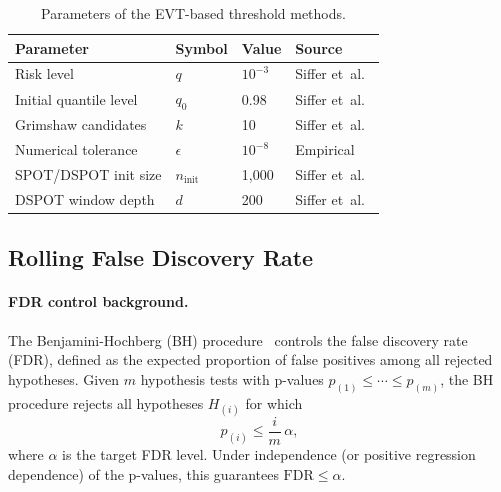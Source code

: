 \documentclass[11pt]{report}
\begin{document}
\begin{table}[H]
\centering
\caption{Parameters of the EVT-based threshold methods.}
\label{tab:evt_params}
\begin{tabular}{llll}
\toprule
\textbf{Parameter} & \textbf{Symbol} & \textbf{Value} & \textbf{Source} \\
\midrule
Risk level & $q$ & $10^{-3}$ & Siffer et~al.~\cite{siffer:hal-01640325} \\
Initial quantile level & $q_0$ & 0.98 & Siffer et~al.~\cite{siffer:hal-01640325} \\
Grimshaw candidates & $k$ & 10 & Siffer et~al.~\cite{siffer:hal-01640325} \\
Numerical tolerance & $\epsilon$ & $10^{-8}$ & Empirical \\
SPOT/DSPOT init size & $n_{\text{init}}$ & 1{,}000 & Siffer et~al.~\cite{siffer:hal-01640325} \\
DSPOT window depth & $d$ & 200 & Siffer et~al.~\cite{siffer:hal-01640325} \\
\bottomrule
\end{tabular}
\end{table}

\subsection{Rolling False Discovery Rate}\label{sec:methodology:thresholds:rfdr}

\paragraph{FDR control background.}
The Benjamini-Hochberg (BH) procedure~\cite{benjamini1995controlling} controls the false discovery rate (FDR), defined as the expected proportion of false positives among all rejected hypotheses. Given $m$ hypothesis tests with p-values $p_{(1)} \le \cdots \le p_{(m)}$, the BH procedure rejects all hypotheses $H_{(i)}$ for which
\begin{equation}
  \label{eq:bh_procedure}
  p_{(i)} \le \frac{i}{m}\,\alpha,
\end{equation}
where $\alpha$ is the target FDR level. Under independence (or positive regression dependence) of the p-values, this guarantees $\mathrm{FDR} \le \alpha$.
\end{document}

